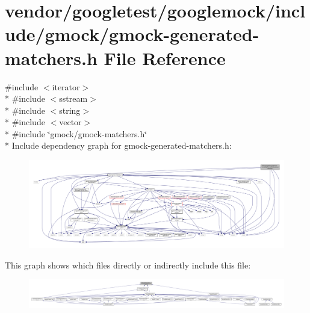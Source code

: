 \hypertarget{gmock-generated-matchers_8h}{}\section{vendor/googletest/googlemock/include/gmock/gmock-\/generated-\/matchers.h File Reference}
\label{gmock-generated-matchers_8h}
{\ttfamily \#include $<$iterator$>$}\\*
{\ttfamily \#include $<$sstream$>$}\\*
{\ttfamily \#include $<$string$>$}\\*
{\ttfamily \#include $<$vector$>$}\\*
{\ttfamily \#include \char`\"{}gmock/gmock-\/matchers.\+h\char`\"{}}\\*
Include dependency graph for gmock-\/generated-\/matchers.h\+:
\nopagebreak
\begin{figure}[H]
\begin{center}
\leavevmode
\includegraphics[width=350pt]{gmock-generated-matchers_8h__incl}
\end{center}
\end{figure}
This graph shows which files directly or indirectly include this file\+:
\nopagebreak
\begin{figure}[H]
\begin{center}
\leavevmode
\includegraphics[width=350pt]{gmock-generated-matchers_8h__dep__incl}
\end{center}
\end{figure}
